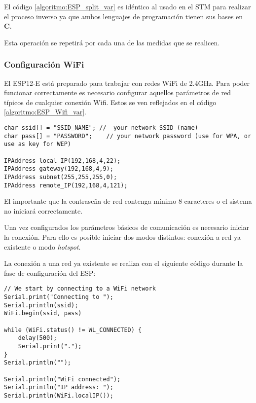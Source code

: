 El código \ref{algoritmo:ESP_split_var} es idéntico al usado en el STM para realizar el proceso inverso ya que ambos lenguajes de programación tienen sus bases en \textbf{C}.

Esta operación se repetirá por cada una de las medidas que se realicen.

\clearpage

\subsubsection{Configuración WiFi\label{sec:Software_Arduino_Conf_WiFi}}

El ESP12-E está preparado para trabajar con redes WiFi de 2.4GHz. Para poder funcionar correctamente es necesario configurar aquellos parámetros de red típicos de cualquier conexión Wifi. Estos se ven reflejados en el código \ref{algoritmo:ESP_Wifi_var}.

\begin{lstlisting}[label=algoritmo:ESP_Wifi_var,style = STM-code,frame=single,caption=Variables y tipos de dato específicos]
char ssid[] = "SSID_NAME"; //  your network SSID (name)
char pass[] = "PASSWORD";    // your network password (use for WPA, or use as key for WEP)

IPAddress local_IP(192,168,4,22);
IPAddress gateway(192,168,4,9);
IPAddress subnet(255,255,255,0);
IPAddress remote_IP(192,168,4,121);
\end{lstlisting}
  
El importante que la contraseña de red contenga mínimo 8 caracteres o el sistema no iniciará correctamente.

Una vez configurados los parámetros básicos de comunicación es necesario iniciar la conexión. Para ello es posible iniciar dos modos distintos: conexión a red ya existente o modo \textit{hotspot}.

La conexión a una red ya existente se realiza con el siguiente código durante la fase de configuración del ESP:
  
\begin{lstlisting}[label=algoritmo:ESP_Wifi,style = STM-code,frame=single,caption=Conexión del ESP a una red WiFi ya existente]
// We start by connecting to a WiFi network
Serial.print("Connecting to ");
Serial.println(ssid);
WiFi.begin(ssid, pass)

while (WiFi.status() != WL_CONNECTED) {
	delay(500);
	Serial.print(".");
}
Serial.println("");
  
Serial.println("WiFi connected");
Serial.println("IP address: ");
Serial.println(WiFi.localIP());
\end{lstlisting}

